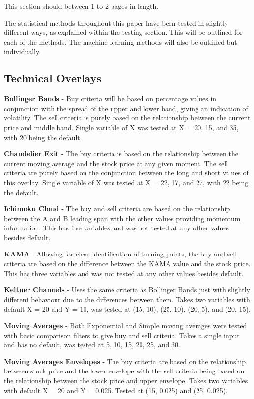 \documentclass[conference]{IEEEtran}
\begin{document}
This section should between 1 to 2 pages in length.
\fi

The statistical methods throughout this paper have been tested in slightly different ways, as explained within the testing section. This will be outlined for each of the methods. The machine learning methods will also be outlined but individually.\\

\subsection{Technical Overlays}

\textbf{Bollinger Bands} - Buy criteria will be based on percentage values in conjunction with the spread of the upper and lower band, giving an indication of volatility. The sell criteria is purely based on the relationship between the current price and middle band. Single variable of X was tested at X = 20, 15, and 35, with 20 being the default.

\textbf{Chandelier Exit} - The buy criteria is based on the relationship between the current moving average and the stock price at any given moment. The sell criteria are purely based on the conjunction between the long and short values of this overlay. Single variable of X was tested at X = 22, 17, and 27, with 22 being the default.

\textbf{Ichimoku Cloud} - The buy and sell criteria are based on the relationship between the A and B leading span with the other values providing momentum information. This has five variables and was not tested at any other values besides default.

\textbf{KAMA} - Allowing for clear identification of turning points, the buy and sell criteria are based on the difference between the KAMA value and the stock price. This has three variables and was not tested at any other values besides default.

\textbf{Keltner Channels} - Uses the same criteria as Bollinger Bands just with slightly different behaviour due to the differences between them. Takes two variables with default X = 20 and Y = 10, was tested at (15, 10), (25, 10), (20, 5), and (20, 15).

\textbf{Moving Averages} - Both Exponential and Simple moving averages were tested with basic comparison filters to give buy and sell criteria. Takes a single input and has no default, was tested at 5, 10, 15, 20, 25, and 30.

\textbf{Moving Averages Envelopes} - The buy criteria are based on the relationship between stock price and the lower envelope with the sell criteria being based on the relationship between the stock price and upper envelope. Takes two variables with default X = 20 and Y = 0.025. Tested at (15, 0.025) and (25, 0.025).
\end{document}
